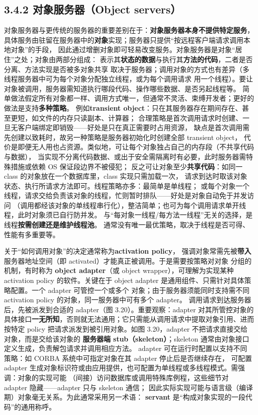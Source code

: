 
\subsection*{3.4.2 对象服务器（Object servers）}
对象服务器与更传统的服务器的重要差别在于：\textbf{对象服务器本身不提供特定服务}，
具体服务由驻留在服务器中的\textbf{对象}实现；服务器只提供“按远程客户端请求调用本地对象”的手段，
因此通过增删对象即可轻易改变服务。对象服务器是对象“居住”之处；对象由两部分组成：
表示其\textbf{状态的数据}与执行其\textbf{方法的代码}，二者是否分离、方法实现是否被多对象共享
取决于服务器；调用对象的方式也有差异（多线程服务器中可为每个对象分配独立线程，或为每个调用请求
用一个线程）。要让对象被调用，服务器需知道执行哪段代码、操作哪些数据、是否另起线程等。
简单做法假定所有对象都一样、调用方式唯一，但通常不灵活、束缚开发者；更好的做法是支持\textbf{多种策略}。
例如\textbf{transient object}：只在其服务器存在期间存在、甚至更短，如文件的内存只读副本、计算器；
合理策略是首次调用请求时创建、一旦无客户端绑定即销毁——好处是只在真正需要时占用资源，
缺点是首次调用需先创建以致耗时，故另一种策略是服务器初始化时创建全部 transient object，
代价是即便无人用也占资源。类似地，可让每个对象独占自己的内存段（不共享代码与数据），
当实现不分离代码数据、或出于安全需隔离时有必要，此时服务器需特殊措施或依赖 OS 保证段边界不被侵犯；
反之可让对象至少\textbf{共享代码}：如同一 class 的对象放在一个数据库里，class 实现只需加载一次，
请求到达时取该对象状态、执行所请求方法即可。线程策略亦多：最简单是单线程；
或每个对象一个线程，请求交给负责该对象的线程，忙则暂时排队——好处是对象自动免于并发访问
（调用都经该对象的单线程串行化），整洁简单；也可为每个调用请求单开线程，此时对象须已自行防并发。
与“每对象一线程/每方法一线程”无关的选择，是线程\textbf{按需创建还是维护线程池}。
通常没有唯一最优策略，取决于线程是否可得、性能有多重要等。

\medskip\noindent 关于“如何调用对象”的决定通常称为\textbf{activation policy}，
强调对象常需先被\textbf{带入}服务器地址空间（即 activated）才能真正被调用。于是需要按策略对对象
分组的机制，有时称为 \textbf{object adapter}（或 object wrapper），可理解为实现某种 activation policy
的软件。关键在于 object adapter 是通用组件、只需针对具体策略配置。一个 adapter 可管控一个或多个
对象；由于服务器须能同时支持需不同 activation policy 的对象，同一服务器中可有多个 adapter。
调用请求到达服务器后，先被派发到合适的 adapter（图 3.20）。重要观察：adapter 对其所管控对象的
具体接口\textbf{一无所知}，否则就无法通用；它只需能从调用请求中提取对象引用、进而按特定 policy
把请求派发到被引用对象。如图 3.20，adapter 不把请求直接交给对象，而是交给该对象的
\textbf{服务器端 stub（skeleton）}；skeleton 通常由对象接口定义生成，负责解包请求并调用相应方法。
adapter 可在运行时配置以支持不同策略：如 CORBA 系统中可指定对象在其 adapter 停止后是否继续存在，
可配置 adapter 生成对象标识符或由应用提供，也可配置为单线程或多线程模式。需强调：对象的实现可能
（间接）访问数据库或调用特殊库例程，这些细节对 adapter 隐藏——adapter 只与 skeleton 通信；
因此实际实现可能与语言级（编译期）对象毫无关系。为此通常采用另一术语：
\textbf{servant} 是“构成对象实现的一段代码”的通用称呼。

